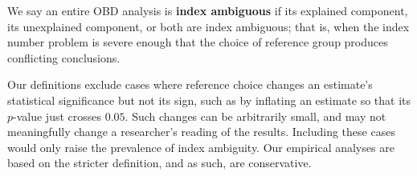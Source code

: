 We say an entire OBD analysis is \textbf{index ambiguous} if its explained component, its unexplained component, or both are index ambiguous; that is, when the index number problem is severe enough that the choice of reference group produces conflicting conclusions.

Our definitions exclude cases where reference choice changes an estimate's statistical significance but not its sign, such as by inflating an estimate so that its $p$-value just crosses $0.05$.
Such changes can be arbitrarily small, and may not meaningfully change a researcher's reading of the results.
Including these cases would only raise the prevalence of index ambiguity. 
Our empirical analyses are based on the stricter definition, and as such, are conservative.